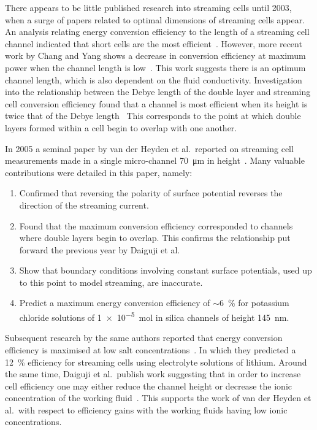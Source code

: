    There appears to be little published research into streaming cells until 2003, when a surge of papers related to optimal dimensions of streaming cells appear.
    An analysis relating energy conversion efficiency to the length of a streaming cell channel indicated that short cells are the most efficient~\cite{Yang2003}.
    However, more recent work by Chang and Yang shows a decrease in conversion efficiency at maximum power when the channel length is low~\cite{Chang2009}.
    This work suggests there is an optimum channel length, which is also dependent on the fluid conductivity.
    Investigation into the relationship between the Debye length of the double layer and streaming cell conversion efficiency found that a channel is most efficient when its height is twice that of the Debye length~\cite{Daiguji2004}
    This corresponds to the point at which double layers formed within a cell begin to overlap with one another.

    In 2005 a seminal paper by van der Heyden et al.\ reported on streaming cell measurements made in a single micro-channel \SI{70}{\micro\meter} in height~\cite{VanderHeyden2005}.
    Many valuable contributions were detailed in this paper, namely:
    \begin{enumerate}
      \item Confirmed that reversing the polarity of surface potential reverses the direction of the streaming current.
      \item Found that the maximum conversion efficiency corresponded to channels where double layers begin to overlap. This confirms the relationship put forward the previous year by Daiguji et al.\
      \item Show that boundary conditions involving constant surface potentials, used up to this point to model streaming, are inaccurate.
      \item Predict a maximum energy conversion efficiency of $\sim$\SI{6}{\percent} for potassium chloride solutions of \SI{1e-5}{\mole} in silica channels of height \SI{145}{\nano\meter}.
    \end{enumerate}
    Subsequent research by the same authors reported that energy conversion efficiency is maximised at low salt concentrations~\cite{VanderHeyden2006}.
    In which they predicted a \SI{12}{\percent} efficiency for streaming cells using electrolyte solutions of lithium.
    Around the same time, Daiguji et al.\ publish work suggesting that in order to increase cell efficiency one may either reduce the channel height or decrease the ionic concentration of the working fluid~\cite{Daiguji2006}.
    This supports the work of van der Heyden et al.\ with respect to efficiency gains with the working fluids having low ionic concentrations.


